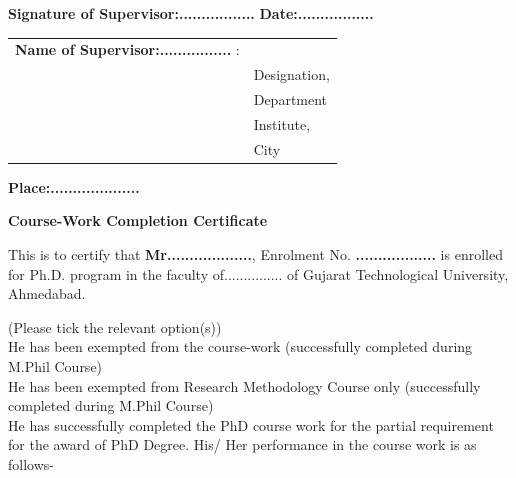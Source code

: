 \vspace{2cm}

\textbf{Signature of Supervisor:.................} \hspace{5cm} \textbf{Date:.................} \\[0.5cm]

\begin{tabular}{ll}
	\textbf{Name of Supervisor:................} : 	&\\
	&Designation,\\
	&Department\\
	&Institute,\\
	&City\\[0.5cm]
\end{tabular}

\textbf{Place:....................} 


\newpage

\begin{center}
	\Large	\textbf{Course-Work Completion Certificate}
\end{center}


This is to certify that \textbf{Mr...................}, Enrolment No. \textbf{..................} is enrolled for Ph.D. program in the faculty of............... of Gujarat Technological University, Ahmedabad.

\vspace{1cm}

(Please tick the relevant option(s))\\

\fbox{\rule{0pt}{1em}\hspace{1em}} \hspace{0.5 cm} He has been exempted from the course-work (successfully completed during M.Phil Course)\\

\fbox{\rule{0pt}{1em}\hspace{1em}} \hspace{0.5 cm} He has been exempted from Research Methodology Course only (successfully completed during M.Phil Course)\\

\fbox{\rule{0pt}{1em}\hspace{1em}} \hspace{0.5 cm} He has successfully completed the PhD course work for the partial requirement for the award of PhD Degree. His/ Her performance in the course work is as follows-

